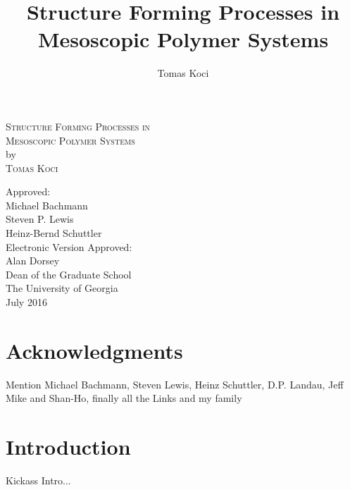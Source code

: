 \documentclass[12pt]{report}
\begin{document}
\newpage
\thispagestyle{empty}
\vspace*{18pt}
\begin{center}
\textsc{Structure Forming Processes in\\Mesoscopic Polymer Systems}\\[18pt]
by\\[18pt]
\textsc{Tomas Koci}
\end{center}
\vfill
\begin{flushleft}\singlespacing
\hskip 200pt {Approved:}\\
\vskip 12pt
\hspace*{200pt}Michael Bachmann\\
\vskip 12pt
\hspace*{200pt}Steven P. Lewis\\
\hspace*{200pt}\makebox[100pt][l]{~                }Heinz-Bernd Schuttler\\
\vfill
Electronic Version Approved:\\[12pt]
Alan Dorsey\\
Dean of the Graduate School\\
The University of Georgia\\
July 2016
\end{flushleft}


\title{\bf Structure Forming Processes in\\Mesoscopic Polymer Systems}
\author{Tomas Koci}
\maketitle 

\chapter*{Acknowledgments}
Mention Michael Bachmann, Steven Lewis, Heinz Schuttler, D.P. Landau, Jeff Mike and Shan-Ho, finally all the Links and my family

\tableofcontents
\listoffigures  %
\listoftables %

\chapter{Introduction}
Kickass Intro...
\end{document}
